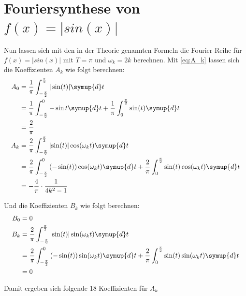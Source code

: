 \newpage
\section{Fouriersynthese von $f(x)=|sin(x)|$}

Nun lassen sich mit den in der Theorie genannten Formeln die Fourier-Reihe für $f(x)=|sin(x)|$ mit $T=\pi$ und $\omega_k = 2k$ berechnen. Mit \autoref{eq:A_k} lassen sich die Koeffizienten $A_k$ wie folgt berechnen:
\begin{align*}
  A_0 &= \frac{1}{\pi} \int_{-\frac{\pi}{2}}^{\frac{\pi}{2}} | \sin(t) | \symup{d}t \\
  &= \frac{1}{\pi} \int_{-\frac{\pi}{2}}^0 -\sin t \symup{d}t + \frac{1}{\pi} \int_0^{\frac{\pi}{2}} \sin(t) \symup{d}t \\
  &= \frac{2}{\pi} \\
  A_k &= \frac{2}{\pi} \int_{-\frac{\pi}{2}}^{\frac{\pi}{2}} \left| \sin(t) \right| \cos(\omega_kt) \symup{d}t \\
  &= \frac{2}{\pi} \int_{-\frac{\pi}{2}}^{0} \left( -\sin(t) \right) \cos(\omega_kt) \symup{d}t + \frac{2}{\pi} \int_{0}^{\frac{\pi}{2}} \sin(t) \cos(\omega_kt) \symup{d}t \\
  &= - \frac{4}{\pi} \cdot \frac{1}{4k^2-1}
\end{align*}

Und die Koeffizienten $B_k$ wie folgt berechnen:
\begin{align*}
  B_0 &= 0 \\
  B_k &= \frac{2}{\pi} \int_{-\frac{\pi}{2}}^{\frac{\pi}{2}} \left| \sin(t) \right| \sin(\omega_kt) \symup{d}t \\
  &= \frac{2}{\pi} \int_{-\frac{\pi}{2}}^{0} \left( -\sin(t) \right) \sin(\omega_kt) \symup{d}t + \frac{2}{\pi} \int_{0}^{\frac{\pi}{2}} \sin(t) \sin(\omega_kt) \symup{d}t \\
  &= 0
\end{align*}

Damit ergeben sich folgende 18 Koeffizienten für $A_k$

